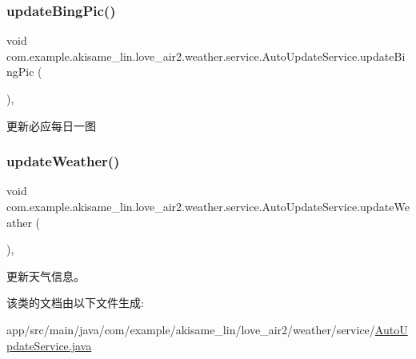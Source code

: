 \subsubsection{\texorpdfstring{updateBingPic()}{updateBingPic()}}
{\footnotesize\ttfamily void com.\+example.\+akisame\+\_\+lin.\+love\+\_\+air2.\+weather.\+service.\+Auto\+Update\+Service.\+update\+Bing\+Pic (\begin{DoxyParamCaption}{ }\end{DoxyParamCaption})\hspace{0.3cm}{\ttfamily [inline]}, {\ttfamily [private]}}

更新必应每日一图 \mbox{\label{classcom_1_1example_1_1akisame__lin_1_1love__air2_1_1weather_1_1service_1_1_auto_update_service_a6a80a8cd2f6a6d64bfd005318b87b017}} 
\subsubsection{\texorpdfstring{updateWeather()}{updateWeather()}}
{\footnotesize\ttfamily void com.\+example.\+akisame\+\_\+lin.\+love\+\_\+air2.\+weather.\+service.\+Auto\+Update\+Service.\+update\+Weather (\begin{DoxyParamCaption}{ }\end{DoxyParamCaption})\hspace{0.3cm}{\ttfamily [inline]}, {\ttfamily [private]}}

更新天气信息。 

该类的文档由以下文件生成\+:\begin{DoxyCompactItemize}
\item 
app/src/main/java/com/example/akisame\+\_\+lin/love\+\_\+air2/weather/service/\mbox{\hyperlink{java_2com_2example_2akisame__lin_2love__air2_2weather_2service_2_auto_update_service_8java}{Auto\+Update\+Service.\+java}}\end{DoxyCompactItemize}
